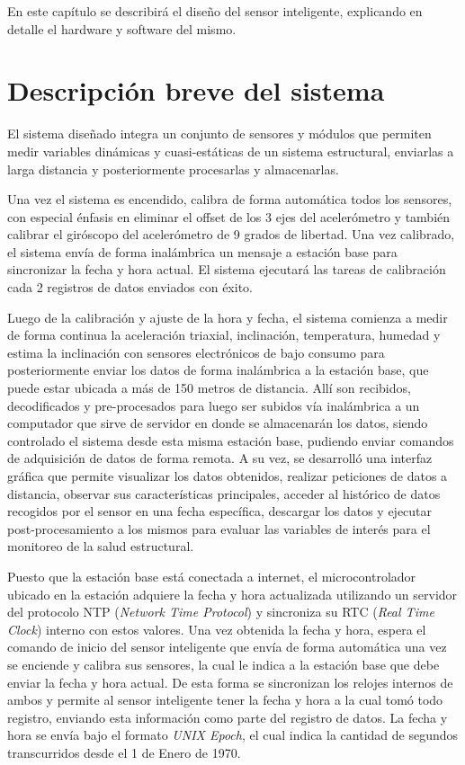 En este capítulo se describirá el diseño del sensor inteligente, explicando en detalle el hardware y software del mismo.

\section{Descripción breve del sistema}
\label{subsec:descpsist}

El sistema diseñado integra un conjunto de sensores y módulos que permiten medir variables dinámicas y cuasi-estáticas de un sistema estructural, enviarlas a larga distancia y posteriormente procesarlas y almacenarlas.

Una vez el sistema es encendido, calibra de forma automática todos los sensores, con especial énfasis en eliminar el offset de los 3 ejes del acelerómetro y también calibrar el giróscopo del acelerómetro de 9 grados de libertad. Una vez calibrado, el sistema envía de forma inalámbrica un mensaje a estación base para sincronizar la fecha y hora actual. El sistema ejecutará las tareas de calibración cada 2 registros de datos enviados con éxito.

Luego de la calibración y ajuste de la hora y fecha,  el sistema comienza a medir de forma continua la aceleración triaxial, inclinación, temperatura, humedad y estima la inclinación con sensores electrónicos de bajo consumo para posteriormente enviar los datos de forma inalámbrica a la estación base, que puede estar ubicada a más de 150 metros de distancia. Allí son recibidos, decodificados y pre-procesados para luego ser subidos vía inalámbrica a un computador que sirve de servidor en donde se almacenarán los datos, siendo controlado el sistema desde esta misma estación base, pudiendo enviar comandos de adquisición de datos de forma remota. A su vez, se desarrolló una interfaz gráfica que permite visualizar los datos obtenidos, realizar peticiones de datos a distancia, observar sus características principales, acceder al histórico de datos recogidos por el sensor en una fecha específica, descargar los datos y ejecutar post-procesamiento a los mismos para evaluar las variables de interés para el monitoreo de la salud estructural.

Puesto que la estación base está conectada a internet, el microcontrolador ubicado en la estación adquiere la fecha y hora actualizada utilizando un servidor del protocolo NTP (\textit{Network Time Protocol}) y sincroniza su RTC (\textit{Real Time Clock}) interno con estos valores. Una vez obtenida la fecha y hora, espera el comando de inicio del sensor inteligente que envía de forma automática una vez se enciende y calibra sus sensores, la cual le indica a la estación base que debe enviar la fecha y hora actual. De esta forma se sincronizan los relojes internos de ambos y permite al sensor inteligente tener la fecha y hora a la cual tomó todo registro, enviando esta información como parte del registro de datos. La fecha y hora se envía bajo el formato \textit{UNIX Epoch}, el cual indica la cantidad de segundos transcurridos desde el 1 de Enero de 1970.
	
